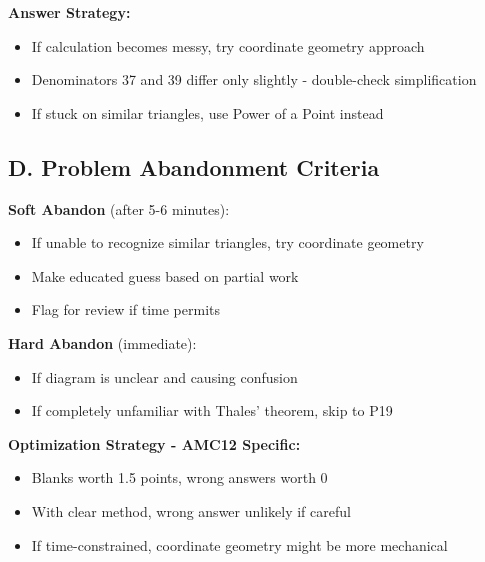 \documentclass[]{article}
\begin{document}
\begin{competitionbox}
\textbf{Answer Strategy:}
\begin{itemize}[leftmargin=*]
    \item If calculation becomes messy, try coordinate geometry approach
    \item Denominators 37 and 39 differ only slightly - double-check simplification
    \item If stuck on similar triangles, use Power of a Point instead
\end{itemize}

\subsection*{D. Problem Abandonment Criteria}

\textbf{Soft Abandon} (after 5-6 minutes):
\begin{itemize}[leftmargin=*]
    \item If unable to recognize similar triangles, try coordinate geometry
    \item Make educated guess based on partial work
    \item Flag for review if time permits
\end{itemize}

\textbf{Hard Abandon} (immediate):
\begin{itemize}[leftmargin=*]
    \item If diagram is unclear and causing confusion
    \item If completely unfamiliar with Thales' theorem, skip to P19
\end{itemize}

\textbf{Optimization Strategy - AMC12 Specific:}
\begin{itemize}[leftmargin=*]
    \item Blanks worth 1.5 points, wrong answers worth 0
    \item With clear method, wrong answer unlikely if careful
    \item If time-constrained, coordinate geometry might be more mechanical
\end{itemize}
\end{competitionbox}
\end{document}
